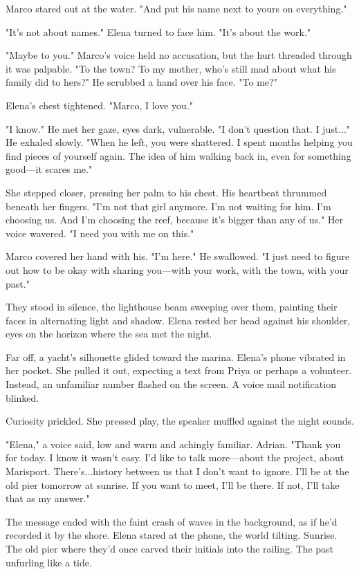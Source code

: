 Marco stared out at the water. "And put his name next to yours on everything."

"It's not about names." Elena turned to face him. "It's about the work."

"Maybe to you." Marco's voice held no accusation, but the hurt threaded through it was palpable. "To the town? To my mother, who's still mad about what his family did to hers?" He scrubbed a hand over his face. "To me?"

Elena's chest tightened. "Marco, I love you."

"I know." He met her gaze, eyes dark, vulnerable. "I don't question that. I just..." He exhaled slowly. "When he left, you were shattered. I spent months helping you find pieces of yourself again. The idea of him walking back in, even for something good—it scares me."

She stepped closer, pressing her palm to his chest. His heartbeat thrummed beneath her fingers. "I'm not that girl anymore. I'm not waiting for him. I'm choosing us. And I'm choosing the reef, because it's bigger than any of us." Her voice wavered. "I need you with me on this."

Marco covered her hand with his. "I'm here." He swallowed. "I just need to figure out how to be okay with sharing you—with your work, with the town, with your past."

They stood in silence, the lighthouse beam sweeping over them, painting their faces in alternating light and shadow. Elena rested her head against his shoulder, eyes on the horizon where the sea met the night.

Far off, a yacht's silhouette glided toward the marina. Elena's phone vibrated in her pocket. She pulled it out, expecting a text from Priya or perhaps a volunteer. Instead, an unfamiliar number flashed on the screen. A voice mail notification blinked.

Curiosity prickled. She pressed play, the speaker muffled against the night sounds.

"Elena," a voice said, low and warm and achingly familiar. Adrian. "Thank you for today. I know it wasn't easy. I'd like to talk more—about the project, about Marisport. There's...history between us that I don't want to ignore. I'll be at the old pier tomorrow at sunrise. If you want to meet, I'll be there. If not, I'll take that as my answer."

The message ended with the faint crash of waves in the background, as if he'd recorded it by the shore. Elena stared at the phone, the world tilting. Sunrise. The old pier where they'd once carved their initials into the railing. The past unfurling like a tide.

